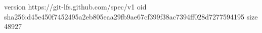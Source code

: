 version https://git-lfs.github.com/spec/v1
oid sha256:d45e450f7452495a2eb805eaa29fb9ae67cf399f38ac7394ff028d7277594195
size 48927
